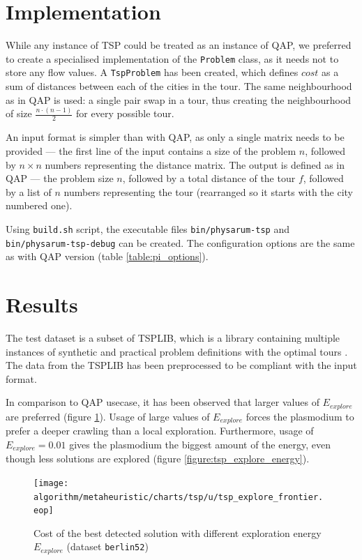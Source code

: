 \documentclass[english,a4paper,twoside]{ppfcmthesis}
\begin{document}
\section*{Implementation}

While any instance of TSP could be treated as an instance of QAP, we preferred to create a specialised implementation of the \texttt{Problem} class, as it needs not to store any flow values. A \texttt{TspProblem} has been created, which defines $cost$ as a sum of distances between each of the cities in the tour. The same neighbourhood as in QAP is used: a single pair swap in a tour, thus creating the neighbourhood of size $\frac{n\cdot(n-1)}{2}$ for every possible tour.

An input format is simpler than with QAP, as only a single matrix needs to be provided --- the first line of the input contains a size of the problem $n$, followed by $n{\times}n$ numbers representing the distance matrix. The output is defined as in QAP --- the problem size $n$, followed by a total distance of the tour $f$, followed by a list of $n$ numbers representing the tour (rearranged so it starts with the city numbered one).

Using \texttt{build.sh} script, the executable files \texttt{bin/physarum-tsp} and \texttt{bin/physarum-tsp-debug} can be created. The configuration options are the same as with QAP version (table \ref{table:pi_options}).


\section*{Results}

The test dataset is a subset of TSPLIB, which is a library containing multiple instances of synthetic and practical problem definitions with the optimal tours \cite{reinhelt2014tsplib}. The data from the TSPLIB has been preprocessed to be compliant with the input format.

In comparison to QAP usecase, it has been observed that larger values of $E_{explore}$ are preferred (figure \ref{figure:tsp_explore_frontier}). Usage of large values of $E_{explore}$ forces the plasmodium to prefer a deeper crawling than a local exploration. Furthermore, usage of $E_{explore}=0.01$ gives the plasmodium the biggest amount of the energy, even though less solutions are explored (figure \ref{figure:tsp_explore_energy}).



\begin{figure}
  \centering

  \texttt{[image: algorithm/metaheuristic/charts/tsp/u/tsp\_explore\_frontier.\\eop]}

  \caption{Cost of the best detected solution with different exploration energy $E_{explore}$ (dataset \texttt{berlin52})}
  \label{figure:tsp_explore_frontier}
\end{figure}
\end{document}
